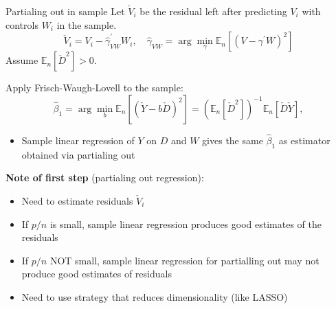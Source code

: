 \documentclass[compress, 8pt]{beamer}
\begin{document}
\begin{frame}{Partialing out in sample}
    Let $\check{V}_i$ be the residual left after predicting $V_i$ with controls $W_i$ in the sample. 
    \begin{equation*}
        \check{V}_i = V_i - \hat{\gamma}_{VW}^\prime W_i, \quad \hat{\gamma}_{VW} = \arg \min_{\gamma} \mathbb{E}_n [(V - \gamma^\prime W)^2]
    \end{equation*}
    Assume $\mathbb{E}_n \left[ \check{D}^2 \right] > 0$.

    \vspace{2ex}
    Apply Frisch-Waugh-Lovell to the sample:
    \begin{equation*}
        \hat{\beta}_1 = \arg \min_{b} \mathbb{E}_n \left[ \left( \check{Y} - b \check{D} \right)^2 \right]
        = \left( \mathbb{E}_n \left[ \check{D}^2 \right] \right)^{-1} \mathbb{E}_n \left[ \check{D} \check{Y} \right],
    \end{equation*}
    \begin{itemize}
        \item [$\implies$] Sample linear regression of $Y$ on $D$ and $W$ gives the same $\hat{\beta}_1$ as estimator obtained via partialing out
    \end{itemize}

    \vspace{2ex}
    \textbf{Note of first step} (partialing out regression):
    \begin{itemize}
        \item Need to estimate residuals $\check{V}_i$
        \item If $p/n$ is small, sample linear regression produces good estimates of the residuals
        \item If $p/n$ NOT small, sample linear regression for partialling out may not produce good estimates of residuals
        \item [$\implies$] Need to use strategy that reduces dimensionality (like LASSO)
    \end{itemize}

\end{frame}
\end{document}
